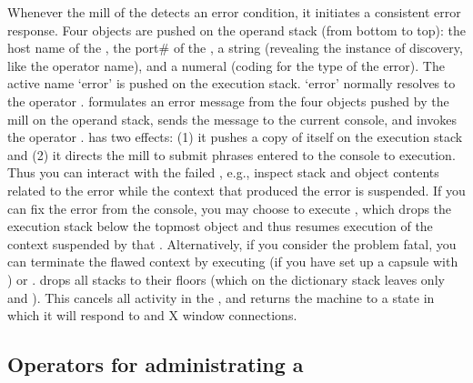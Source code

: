 Whenever the mill of the  detects an error condition, it
initiates a consistent error response. Four objects are pushed on the
operand stack (from bottom to top): the host name of the
, the port\# of the , a string (revealing
the instance of discovery, like the operator name), and a numeral
(coding for the type of the error). The active name `error' is pushed
on the execution stack. `error' normally resolves to the operator
.  formulates an error message from the four
objects pushed by the mill on the operand stack, sends the message to
the current console, and invokes the operator .  has
two effects: (1) it pushes a copy of itself on the execution stack and
(2) it directs the mill to submit phrases entered to the console to
execution. Thus you can interact with the failed , e.g.,
inspect stack and object contents related to the error while the
context that produced the error is suspended. If you can fix the error
from the console, you may choose to execute , which drops
the execution stack below the topmost  object and thus
resumes execution of the context suspended by that
. Alternatively, if you consider the problem fatal, you can
terminate the flawed context by executing  (if you have set
up a capsule with ) or .  drops all
stacks to their floors (which on the dictionary stack leaves only
 and ). This cancels all activity in the
, and returns the machine to a state in which it will
respond to  and X window connections.


\subsection{Operators for administrating  a }\label{ssec:opsdnode} 

